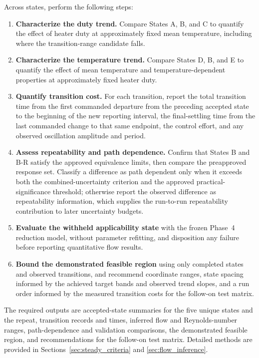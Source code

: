 \documentclass[11pt]{article}
\begin{document}
Across states, perform the following steps:

\begin{enumerate}
    \item \textbf{Characterize the duty trend.} Compare States A, B, and C to quantify the effect of heater duty at approximately fixed mean temperature, including where the transition-range candidate falls.

    \item \textbf{Characterize the temperature trend.} Compare States D, B, and E to quantify the effect of mean temperature and temperature-dependent properties at approximately fixed heater duty.

    \item \textbf{Quantify transition cost.} For each transition, report the total transition time from the first commanded departure from the preceding accepted state to the beginning of the new reporting interval, the final-settling time from the last commanded change to that same endpoint, the control effort, and any observed oscillation amplitude and period.

    \item \textbf{Assess repeatability and path dependence.} Confirm that States B and B-R satisfy the approved equivalence limits, then compare the preapproved response set. Classify a difference as path dependent only when it exceeds both the combined-uncertainty criterion and the approved practical-significance threshold; otherwise report the observed difference as repeatability information, which supplies the run-to-run repeatability contribution to later uncertainty budgets.

    \item \textbf{Evaluate the withheld applicability state} with the frozen Phase~4 reduction model, without parameter refitting, and disposition any failure before reporting quantitative flow results.

    \item \textbf{Bound the demonstrated feasible region} using only completed states and observed transitions, and recommend coordinate ranges, state spacing informed by the achieved target bands and observed trend slopes, and a run order informed by the measured transition costs for the follow-on test matrix.
\end{enumerate}

The required outputs are accepted-state summaries for the five unique states and the repeat, transition records and times, inferred flow and Reynolds-number ranges, path-dependence and validation comparisons, the demonstrated feasible region, and recommendations for the follow-on test matrix. Detailed methods are provided in Sections~\ref{sec:steady_criteria} and \ref{sec:flow_inference}.
\end{document}
